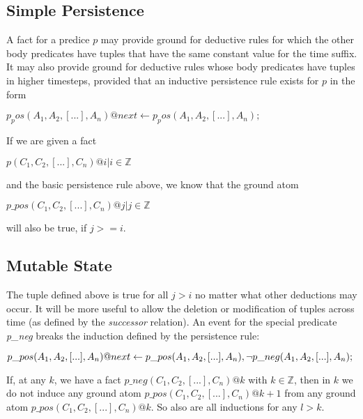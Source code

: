 \documentclass{acm_proc_article-sp-sigmod09}
\newcommand{\paa}[1]{{\textcolor{blue}{#1 -- paa}}}
\begin{document}
\subsection{Simple Persistence}

A fact for a predice $p$ may provide ground for deductive rules for which the other body predicates have 
tuples that have the same constant value for the time suffix.  It may also provide 
ground for deductive rules whose body predicates have tuples in higher timesteps, provided 
that an inductive persistence rule exists for $p$ in the form 

$p_pos(A_1,A_2,[...],A_n)@next \leftarrow 
p_pos(A_1,A_2,[...],A_n);$

If we are given a fact 

$p(C_1, C_2,[...],C_n)@i |   i \in \mathbb{Z}$


and the basic persistence rule above, we know that the ground atom

$p\_pos(C_1, C_2,[...],C_n)@j | j \in \mathbb{Z}$

will also be true, if $j >= i$.

\subsection{Mutable State}

The tuple defined above is true for all $j > i$ no matter what other deductions may occur.  It will be more useful
to allow the deletion or modification of tuples across time (as defined by the \emph{successor} relation).  An
event for the special predicate \emph{p\_neg} breaks the induction defined by the persistence rule:

$p\_pos(A_1,A_2,[...],A_n)@next \leftarrow \\
p\_pos(A_1,A_2,[...],A_n), \\
\lnot p\_neg(A_1,A_2,[...],A_n);
$

If, at any $k$, we have a fact $p\_neg(C_1,C_2,[...],C_n)@k$ with $k \in \mathbb{Z}$,  then in $k$
we do not induce any ground atom $p\_pos(C_1,C_2,[...],C_n)@k+1$ from any ground atom
$p\_pos(C_1,C_2,[...],C_n)@k$.  So also are all inductions for any $l > k$.



 
\end{document}
